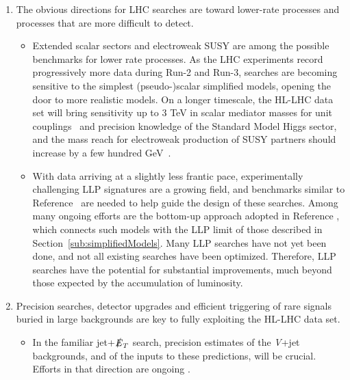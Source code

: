 \documentclass{ar-1col}
\newcommand{\MET}{\ensuremath{\slashed{E}_T}\xspace}
\begin{document}
\begin{issues}
\begin{enumerate}

\item The obvious directions for LHC searches are toward lower-rate
processes and processes that are more difficult to detect.

\begin{itemize}

\item Extended scalar sectors and electroweak SUSY
are among the possible benchmarks for lower rate processes.
As the LHC experiments record progressively more data during Run-2 and Run-3, 
searches are becoming sensitive to the simplest (pseudo-)scalar simplified
models, opening the door to more realistic models. On a longer
timescale, the HL-LHC data set will bring sensitivity up to 3
TeV in scalar mediator masses for unit
couplings~\cite{CMS-PAS-FTR-16-005} and precision knowledge of the
Standard Model Higgs sector, and the mass reach for
electroweak production of SUSY partners should increase by a few hundred
GeV~\cite{Campana:2016cqm}.

\item With data arriving at a slightly less frantic pace, experimentally
challenging LLP signatures are a growing field,
and benchmarks similar to Reference~ are
needed to help guide the design of these searches. Among many
ongoing efforts are the bottom-up approach adopted in
Reference , which connects such models with
the LLP limit of those described in
Section~\ref{sub:simplifiedModels}. 
Many LLP searches have not yet been done, and not all existing searches have been optimized. 
Therefore, LLP searches have the potential for substantial improvements, 
much beyond those expected by the accumulation of luminosity. 

\end{itemize}

\item Precision searches, detector upgrades and efficient triggering of rare signals buried
in large backgrounds are key to fully exploiting the HL-LHC data set. 

\begin{itemize} 

\item In the familiar jet+\MET search,
precision estimates of the \textit{V}+jet backgrounds, and of the inputs to
these predictions, will be crucial. Efforts in that
direction are ongoing \cite{Blumenschein:2018gtm}.


\end{itemize}
\end{enumerate}
\end{issues}
\end{document}
